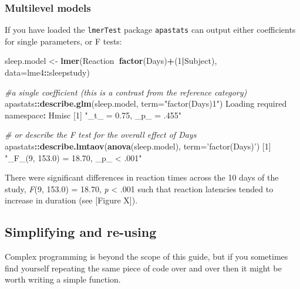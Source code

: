 \documentclass[]{article}
\newenvironment{Shaded}{\begin{snugshade}}{\end{snugshade}}
\newcommand{\CommentTok}[1]{\textcolor[rgb]{0.56,0.35,0.01}{\textit{#1}}}
\newcommand{\DataTypeTok}[1]{\textcolor[rgb]{0.13,0.29,0.53}{#1}}
\newcommand{\DecValTok}[1]{\textcolor[rgb]{0.00,0.00,0.81}{#1}}
\newcommand{\KeywordTok}[1]{\textcolor[rgb]{0.13,0.29,0.53}{\textbf{#1}}}
\newcommand{\NormalTok}[1]{#1}
\newcommand{\OperatorTok}[1]{\textcolor[rgb]{0.81,0.36,0.00}{\textbf{#1}}}
\newcommand{\StringTok}[1]{\textcolor[rgb]{0.31,0.60,0.02}{#1}}
\begin{document}
\hypertarget{multilevel-models-1}{%
\subsubsection*{Multilevel models}\label{multilevel-models-1}}

If you have loaded the \texttt{lmerTest} package \texttt{apastats} can output either
coefficients for single parameters, or F tests:

\begin{Shaded}
\begin{Highlighting}[]
\NormalTok{sleep.model <-}\StringTok{ }\KeywordTok{lmer}\NormalTok{(Reaction}\OperatorTok{~}\KeywordTok{factor}\NormalTok{(Days)}\OperatorTok{+}\NormalTok{(}\DecValTok{1}\OperatorTok{|}\NormalTok{Subject), }\DataTypeTok{data=}\NormalTok{lme4}\OperatorTok{::}\NormalTok{sleepstudy)}

\CommentTok{#a single coefficient (this is a contrast from the reference category)}
\NormalTok{apastats}\OperatorTok{::}\KeywordTok{describe.glm}\NormalTok{(sleep.model, }\DataTypeTok{term=}\StringTok{"factor(Days)1"}\NormalTok{)}
\NormalTok{Loading required namespace}\OperatorTok{:}\StringTok{ }\NormalTok{Hmisc}
\NormalTok{[}\DecValTok{1}\NormalTok{] }\StringTok{"_t_ =  0.75, _p_ = .455"}

\CommentTok{# or describe the F test for the overall effect of Days}
\NormalTok{apastats}\OperatorTok{::}\KeywordTok{describe.lmtaov}\NormalTok{(}\KeywordTok{anova}\NormalTok{(sleep.model), }\DataTypeTok{term=}\StringTok{'factor(Days)'}\NormalTok{)}
\NormalTok{[}\DecValTok{1}\NormalTok{] }\StringTok{"_F_(9, 153.0) = 18.70, _p_ < .001"}
\end{Highlighting}
\end{Shaded}

{There were significant differences in reaction times across the 10 days of the
study, \emph{F}(9, 153.0) = 18.70, \emph{p} \textless{} .001 such that reaction latencies tended to increase in duration
(see {[}Figure X{]}).}

\hypertarget{code-reuse}{%
\subsection*{Simplifying and re-using}\label{code-reuse}}

Complex programming is beyond the scope of this guide, but if you sometimes find
yourself repeating the same piece of code over and over then it might be worth
writing a simple function.
\end{document}
